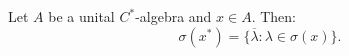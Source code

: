 Let $A$ be a unital $C^*$-algebra and $x \in A$. Then:
$$\sigma(x^*) = \{\overline{\lambda} : \lambda \in \sigma(x)\}.$$

